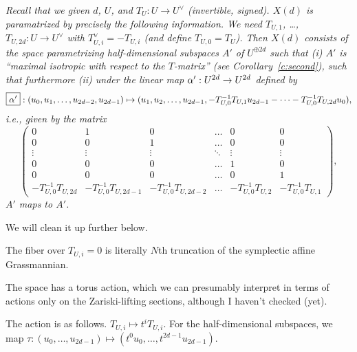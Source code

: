 {  \label{t:nextform}{\em Recall that we given $d$, $U$, and $T_U: U \rightarrow U^\vee$ (invertible, signed).
  $X(d)$ is paramatrized by precisely the following information.
  We need $T_{U,1}$, \dots, $T_{U,2d}: U \rightarrow U^\vee$ with $T_{U,i}^\vee = - T_{U,i}$ (and define $T_{U,0}=T_U$). Then $X(d)$ consists of the space parametrizing half-dimensional subspaces $\boxed{A'}$ of $U^{\oplus 2d}$ such that (i)
  $A'$ is ``maximal isotropic with respect to the $T$-matrix'' 
 (see Corollary~\ref{c:second}), such that furthermore
(ii)  under the linear map $\alpha' : U^{2d} \rightarrow U^{2d}$ defined by  $$\boxed{\alpha'}: (u_0, u_1, \dots, u_{2d-2}, u_{2d-1}) \mapsto
 (u_1, u_2, \dots, u_{2d-1},
 -T^{-1}_{U,0} T_{U,1} u_{2d-1}  - \cdots  -T^{-1}_{U,0} T_{U,2d} u_0 ),$$
 i.e., given by the matrix 
\begin{equation}\label{eq:shift}
\begin{pmatrix}
  0 & 1  & 0 & \hdots &       0 &  0 \\
  0 & 0 &  1 & \hdots &       0 &  0 \\
\vdots & \vdots & \vdots & \ddots & \vdots & \vdots \\
  0 & 0 &  0 & \hdots &       1 &  0 \\
  0 & 0 &  0 & \hdots &       0 &  1 \\
-T^{-1}_{U,0} T_{U,2d} & -T^{-1}_{U,0}T_{U,2d-1} & -T^{-1}_{U,0}T_{U,2d-2} & \hdots & -T^{-1}_{U,0}T_{U,2} & -T^{-1}_{U,0}T_{U,1} 
  \end{pmatrix},
\end{equation}
 $A'$ maps to $A'$.  
}

We will clean it up further below.

 The fiber over $T_{U,i}=0$ is literally $N$th truncation of the symplectic affine Grassmannian.


The space has a torus action, which we can presumably interpret in terms
of actions only on the Zariski-lifting sections, although I haven't checked (yet).

The action is as follows.  $T_{U,i} \mapsto t^i T_{U,i}$.
For the half-dimensional subspaces,
we map $\tau: (u_0, \dots, u_{2d-1}) \mapsto (t^0 u_0, \dots, t^{2d-1} u_{2d-1})$.

}
